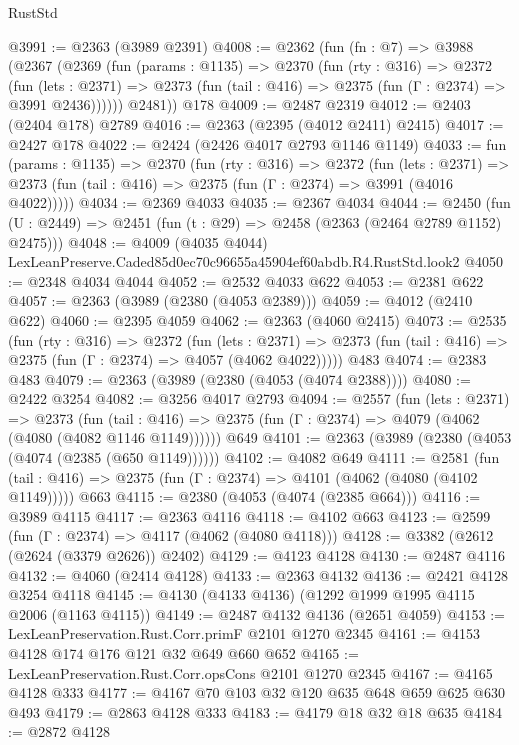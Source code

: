 \begin{lexlean}{RustStd}
\begin{coremodule}
@3991 := @2363 (@3989 @2391)
@4008 := @2362
    (fun (fn : @7) =>
    @3988
      (@2367
        (@2369
          (fun (params : @1135) =>
          @2370
            (fun (rty : @316) =>
            @2372
              (fun (lets : @2371) =>
              @2373 (fun (tail : @416) => @2375 (fun (Γ : @2374) => @3991 @2436))))))
        @2481))
    @178
@4009 := @2487 @2319
@4012 := @2403 (@2404 @178) @2789
@4016 := @2363 (@2395 (@4012 @2411) @2415)
@4017 := @2427 @178
@4022 := @2424 (@2426 @4017 @2793 @1146 @1149)
@4033 := fun (params : @1135) =>
  @2370
    (fun (rty : @316) =>
    @2372
      (fun (lets : @2371) =>
      @2373 (fun (tail : @416) => @2375 (fun (Γ : @2374) => @3991 (@4016 @4022)))))
@4034 := @2369 @4033
@4035 := @2367 @4034
@4044 := @2450 (fun (U : @2449) => @2451 (fun (t : @29) => @2458 (@2363 (@2464 @2789 @1152) @2475)))
@4048 := @4009 (@4035 @4044) LexLeanPreserve.Caded85d0ec70c96655a45904ef60abdb.R4.RustStd.look2
@4050 := @2348 @4034 @4044
@4052 := @2532 @4033 @622
@4053 := @2381 @622
@4057 := @2363 (@3989 (@2380 (@4053 @2389)))
@4059 := @4012 (@2410 @622)
@4060 := @2395 @4059
@4062 := @2363 (@4060 @2415)
@4073 := @2535
    (fun (rty : @316) =>
    @2372
      (fun (lets : @2371) =>
      @2373 (fun (tail : @416) => @2375 (fun (Γ : @2374) => @4057 (@4062 @4022)))))
    @483
@4074 := @2383 @483
@4079 := @2363 (@3989 (@2380 (@4053 (@4074 @2388))))
@4080 := @2422 @3254
@4082 := @3256 @4017 @2793
@4094 := @2557
    (fun (lets : @2371) =>
    @2373
      (fun (tail : @416) => @2375 (fun (Γ : @2374) => @4079 (@4062 (@4080 (@4082 @1146 @1149))))))
    @649
@4101 := @2363 (@3989 (@2380 (@4053 (@4074 (@2385 (@650 @1149))))))
@4102 := @4082 @649
@4111 := @2581
    (fun (tail : @416) => @2375 (fun (Γ : @2374) => @4101 (@4062 (@4080 (@4102 @1149)))))
    @663
@4115 := @2380 (@4053 (@4074 (@2385 @664)))
@4116 := @3989 @4115
@4117 := @2363 @4116
@4118 := @4102 @663
@4123 := @2599 (fun (Γ : @2374) => @4117 (@4062 (@4080 @4118)))
@4128 := @3382 (@2612 (@2624 (@3379 @2626)) @2402)
@4129 := @4123 @4128
@4130 := @2487 @4116
@4132 := @4060 (@2414 @4128)
@4133 := @2363 @4132
@4136 := @2421 @4128 @3254 @4118
@4145 := @4130 (@4133 @4136) (@1292 @1999 @1995 @4115 @2006 (@1163 @4115))
@4149 := @2487 @4132 @4136 (@2651 @4059)
@4153 := LexLeanPreservation.Rust.Corr.primF @2101 @1270 @2345
@4161 := @4153 @4128 @174 @176 @121 @32 @649 @660 @652
@4165 := LexLeanPreservation.Rust.Corr.opsCons @2101 @1270 @2345
@4167 := @4165 @4128 @333
@4177 := @4167 @70 @103 @32 @120 @635 @648 @659 @625 @630 @493
@4179 := @2863 @4128 @333
@4183 := @4179 @18 @32 @18 @635
@4184 := @2872 @4128

\end{coremodule}
\end{lexlean}
